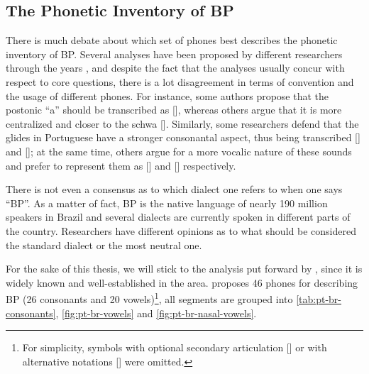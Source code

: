 \subsection{The Phonetic Inventory of \gls{BP}} 

There is much debate about which set of phones best describes the phonetic inventory of \gls{BP}. Several analyses have been proposed by different researchers through the years \cite{Bisol2005, Cagliari2002, Camara1970, Cristofaro2005, Neves1999}, and despite the fact that the analyses usually concur with respect to core questions, there is a lot disagreement in terms of convention and the usage of different phones.  For instance, some authors propose that the postonic ``a'' should be transcribed as [], whereas others argue that it is more centralized and closer to the schwa []. Similarly, some researchers defend that the glides in Portuguese have a stronger consonantal aspect, thus being transcribed [] and []; at the same time, others argue for a more vocalic nature of these sounds and prefer to represent them as [] and [] respectively. 

There is not even a consensus as to which dialect one refers to when one says ``\gls{BP}''. As a matter of fact, \gls{BP} is the native language of nearly 190 million speakers in Brazil \cite{Ethnologue2005} and several dialects are currently spoken in different parts of the country. Researchers have different opinions as to what should be considered the standard dialect or the most neutral one.

For the sake of this thesis, we will stick to the analysis put forward by \citet{Cristofaro2005}, since it is widely known and well-established in the area. \citet{Cristofaro2005} proposes 46 phones for describing \gls{BP} (26 consonants and 20 vowels)\footnote{For simplicity, symbols with optional secondary articulation [] or with alternative notations [] were omitted.}, all segments are grouped into \autoref{tab:pt-br-consonants}, \autoref{fig:pt-br-vowels} and \autoref{fig:pt-br-nasal-vowels}.

